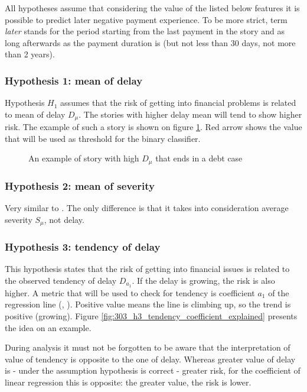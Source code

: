 \documentclass{article}
\begin{document}
All hypotheses assume that considering the value of the listed below features it is possible to predict later negative payment experience.
To be more strict, term \textit{later} stands for the period starting from the last payment in the story and as long afterwards
as the payment duration is (but not less than 30 days, not more than 2 years).

\subsubsection{Hypothesis 1: mean of delay}
\label{section:H1}

Hypothesis $H_1$ assumes that the risk of getting into financial problems is related to mean of delay $D_\mu$.
The stories with higher delay mean will tend to show higher risk.
The example of such a story is shown on figure \ref{fig:302_h1_delay_mean_explained}.
Red arrow shows the value that will be used as threshold for the binary classifier.

\begin{figure}[htbp!]
    \begin{center}
        
    \caption{An example of story with high $D_\mu$ that ends in a debt case}
    \label{fig:302_h1_delay_mean_explained}
    \end{center}
\end{figure}

\subsubsection{Hypothesis 2: mean of severity}

Very similar to .
The only difference is that it takes into consideration average severity $S_{\mu}$, not delay.

\subsubsection{Hypothesis 3: tendency of delay}
\label{section:H3}

This hypothesis states that the risk of getting into financial issues is related to the observed tendency of delay $D_{a_1}$.
If the delay is growing, the risk is also higher.
A metric that will be used to check for tendency is coefficient $a_1$ of the regression line (\cite{the-art}, \cite{repetytorium}).
Positive value means the line is climbing up, so the trend is positive (growing).
Figure \ref{fig:303_h3_tendency_coefficient_explained} presents the idea on an example.
\par During analysis it must not be forgotten to be aware that the interpretation of value of tendency is opposite to the one of delay.
Whereas greater value of delay is - under the assumption hypothesis is correct - greater risk,
for the coefficient of linear regression this is opposite: the greater value, the risk is lower.
\end{document}
